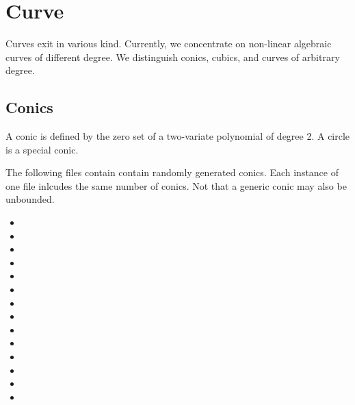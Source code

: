 \section{Curve\label{bi_cha:Curve}}

Curves exit in various kind. Currently, we concentrate on
non-linear algebraic curves of different degree. We 
distinguish conics, cubics, and curves of arbitrary degree.

\subsection{Conics\label{bi_sec:Arrangement2Conics}}

A conic is defined by the zero set of a two-variate polynomial
of degree 2. A circle is a special conic.

The following files contain contain randomly generated conics. 
Each instance of one file inlcudes the same number of conics. Not that
a generic conic may also be unbounded.

\begin{itemize}
\item {}
\item {}
\item {}
\item {}
\item {}
\item {}
\item {}
\item {}
\item {}
\item {}
\item {}
\item {}
\item {}
\item {}
\end{itemize}

